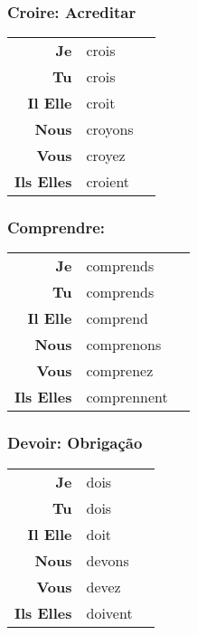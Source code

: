 \documentclass{subfiles}
\begin{document}
\begin{multicols}{3}
        \subsubsection{Croire: Acreditar}
            \begin{tabular}{r l r}
                \textbf{Je}        & crois   &\\
                \textbf{Tu}        & crois   &\\
                \textbf{Il Elle}   & croit   &\\
                \textbf{Nous}      & croyons &\\
                \textbf{Vous}      & croyez  &\\
                \textbf{Ils Elles} & croient &
            \end{tabular}

        \subsubsection{Comprendre:}
            \begin{tabular}{r l r}
                \textbf{Je}        & comprends   &\\
                \textbf{Tu}        & comprends   &\\
                \textbf{Il Elle}   & comprend    &\\
                \textbf{Nous}      & comprenons  &\\
                \textbf{Vous}      & comprenez   &\\
                \textbf{Ils Elles} & comprennent &
            \end{tabular}

        \subsubsection{Devoir: Obrigação}
            \begin{tabular}{r l r}
                \textbf{Je}        & dois    &\\
                \textbf{Tu}        & dois    &\\
                \textbf{Il Elle}   & doit    &\\
                \textbf{Nous}      & devons  &\\
                \textbf{Vous}      & devez   &\\
                \textbf{Ils Elles} & doivent &
            \end{tabular}


\end{multicols}
\end{document}
